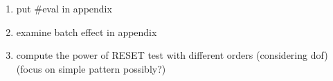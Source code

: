 \documentclass[]{interact}
\theoremstyle{plain}%
\theoremstyle{definition}
\theoremstyle{remark}
\providecommand{\tightlist}{%
  \setlength{\itemsep}{0pt}\setlength{\parskip}{0pt}}
\def\tightlist{}
\begin{document}
\newpage

\begin{enumerate}
\def\labelenumi{\arabic{enumi}.}
\tightlist
\item
  put \#eval in appendix
\item
  examine batch effect in appendix
\item
  compute the power of RESET test with different orders (considering
  dof) (focus on simple pattern possibly?)
\end{enumerate}



\end{document}

